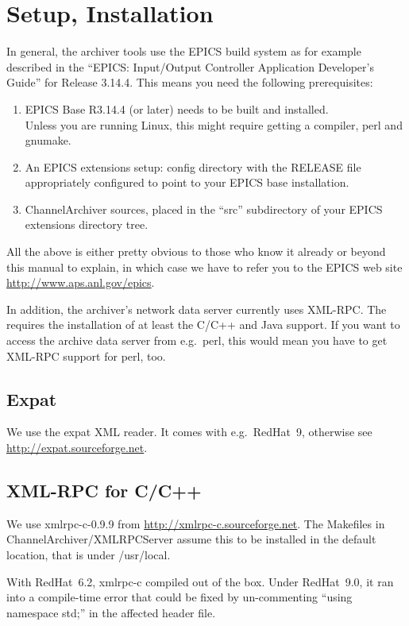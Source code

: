\chapter{Setup, Installation}
In general, the archiver tools use the EPICS build system as for
example described in the ``EPICS: Input/Output Controller Application
Developer's Guide'' for Release 3.14.4.
This means you need the following prerequisites:
\begin{enumerate}
\item EPICS Base R3.14.4 (or later) needs to be built and installed.\\
      Unless you are running Linux, this might require getting a
      compiler, perl and gnumake.
\item An EPICS extensions setup: config directory with the RELEASE
      file appropriately configured to point to your EPICS base installation.
\item ChannelArchiver sources, placed in the ``src'' subdirectory of
      your EPICS extensions directory tree. 
\end{enumerate}

\noindent All the above is either pretty obvious to those who know it already
or beyond this manual to explain, in which case we have to refer you
to the EPICS web site 
\href{http://www.aps.anl.gov/epics}{http://www.aps.anl.gov/epics}. 

In addition, the archiver's network data server currently uses
XML-RPC. The  requires the installation of at
least the C/C++ and Java support. If you want to access the archive
data server from e.g.\ perl, this would mean you have to get XML-RPC
support for perl, too.

\section{Expat}
We use the expat XML reader. It comes with e.g.\ RedHat~9,
otherwise see
\href{http://expat.sourceforge.net}{http://expat.sourceforge.net}.

\section{XML-RPC for C/C++}
We use xmlrpc-c-0.9.9 from
\href{http://xmlrpc-c.sourceforge.net}{http://xmlrpc-c.sourceforge.net}.
The Makefiles in ChannelArchiver/XMLRPCServer assume this to be
installed in the default location, that is under /usr/local.

With RedHat~6.2, xmlrpc-c compiled out of the box.
Under RedHat~9.0, it ran into a compile-time error that could be fixed
by un-commenting ``using namespace std;'' in the affected header file.

